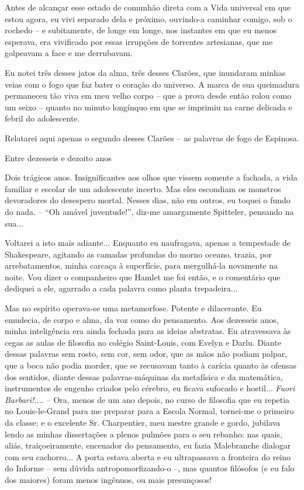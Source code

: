 Antes de alcançar esse estado de comunhão direta com a Vida universal em
que estou agora, eu vivi separado dela e próximo, ouvindo-a caminhar
comigo, sob o rochedo -- e subitamente, de longe em longe, nos instantes
em que eu menos esperava, era vivificado por essas irrupções de
torrentes artesianas, que me golpeavam a face e me derrubavam.

Eu notei três desses jatos da alma, três desses Clarões, que inundaram
minhas veias com o fogo que faz bater o coração do universo. A marca de
sua queimadura permaneceu tão viva em meu velho corpo -- que a prova
desde então rolou como um seixo -- quanto no minuto longínquo em que se
imprimiu na carne delicada e febril do adolescente.

Relatarei aqui apenas o segundo desses Clarões -- as palavras de fogo de
Espinosa.

Entre dezesseis e dezoito anos

Dois trágicos anos. Insignificantes aos olhos que vissem somente a
fachada, a vida familiar e escolar de um adolescente incerto. Mas eles
escondiam os monstros devoradores do desespero mortal. Nesses dias, não
em outros, eu toquei o fundo do nada. -- ``Oh amável juventude!'',
diz-me amargamente Spitteler, pensando na sua...

Voltarei a isto mais adiante... Enquanto eu naufragava, apenas a
tempestade de Shakespeare, agitando as camadas profundas do morno
oceano, trazia, por arrebatamentos, minha carcaça à superfície, para
mergulhá-la novamente na noite. Vou dizer o companheiro que Hamlet me
foi então, e o comentário que dediquei a ele, agarrado a cada palavra
como planta trepadeira...

Mas no espírito operava-se uma metamorfose. Potente e dilacerante. Eu
emudecia, de corpo e alma, da voz como do pensamento. Aos dezesseis
anos, minha inteligência era ainda fechada para as ideias abstratas. Eu
atravessava às cegas as aulas de filosofia no colégio Saint-Louis, com
Evelyn e Darlu. Diante dessas palavras sem rosto, sem cor, sem odor, que
as mãos não podiam palpar, que a boca não podia morder, que se recusavam
tanto à carícia quanto às ofensas dos sentidos, diante dessas
palavras-máquinas da metafísica e da matemática, instrumentos de engenho
criados pelo cérebro, eu ficava sufocado e hostil... \emph{Fuori
Barbari!...}. -- Ora, menos de um ano depois, no curso de filosofia que
eu repetia no Louis-le-Grand para me preparar para a Escola Normal,
tornei-me o primeiro da classe; e o excelente Sr. Charpentier, meu
mestre grande e gordo, jubilava lendo as minhas dissertações a plenos
pulmões para o seu rebanho: nas quais, aliás, traiçoeiramente, encenador
do pensamento, eu fazia Malebranche dialogar com seu cachorro... A porta
estava aberta e eu ultrapassava a fronteira do reino do Informe -- sem
dúvida antropomorfizando-o --, mas quantos filósofos (e eu falo dos
maiores) foram menos ingênuos, ou mais presunçosos!

